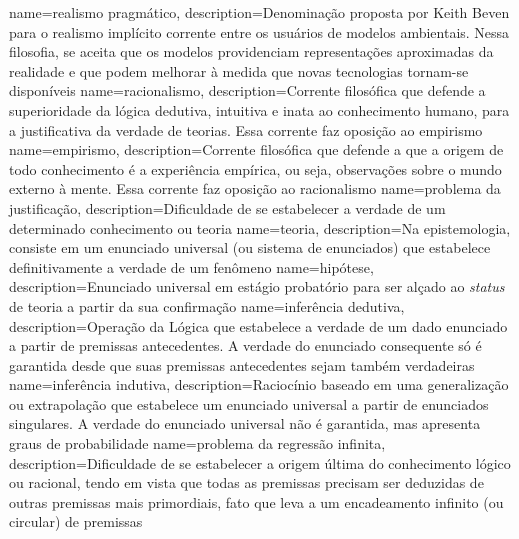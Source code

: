 \makeglossaries

{
    name=realismo pragmático,
    description={Denominação proposta por Keith Beven para o realismo implícito corrente entre os usuários de modelos ambientais. Nessa filosofia, se aceita que os modelos providenciam representações aproximadas da realidade e que podem melhorar à medida que novas tecnologias tornam-se disponíveis}
}
{
    name=racionalismo,
    description={Corrente filosófica que defende a superioridade da lógica dedutiva, intuitiva e inata ao conhecimento humano, para a justificativa da verdade de teorias. Essa corrente faz oposição ao empirismo}
}
{
    name=empirismo,
    description={Corrente filosófica que defende a que a origem de todo conhecimento é a experiência empírica, ou seja, observações sobre o mundo externo à mente. Essa corrente faz oposição ao racionalismo}
}
{
    name=problema da justificação,
    description={Dificuldade de se estabelecer a verdade de um determinado conhecimento ou teoria}
}
{
    name=teoria,
    description={Na epistemologia, consiste em um enunciado universal (ou sistema de enunciados) que estabelece definitivamente a verdade de um fenômeno}
}
{
    name=hipótese,
    description={Enunciado universal em estágio probatório para ser alçado ao \textit{status} de teoria a partir da sua confirmação}
}
{
    name=inferência dedutiva,
    description={Operação da Lógica que estabelece a verdade de um dado enunciado a partir de premissas antecedentes. A verdade do enunciado consequente só é garantida desde que suas premissas antecedentes sejam também verdadeiras}
}
{
    name=inferência indutiva,
    description={Raciocínio baseado em uma generalização ou extrapolação que estabelece um enunciado universal a partir de enunciados singulares. A verdade do enunciado universal não é garantida, mas apresenta graus de probabilidade}
}
{
    name=problema da regressão infinita,
    description={Dificuldade de se estabelecer a origem última do conhecimento lógico ou racional, tendo em vista que todas as premissas precisam ser deduzidas de outras premissas mais primordiais, fato que leva a um encadeamento infinito (ou circular) de premissas}
}
